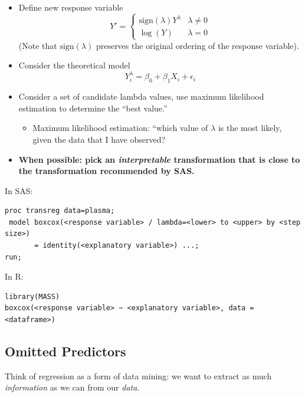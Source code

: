 \documentclass[12pt]{../notes}
\begin{document}
\begin{itemize}
\item Define new response variable 
\[Y' = 
\begin{cases} 
\text{sign}(\lambda)Y^\lambda & \lambda \ne 0 \\
\log(Y) & \lambda = 0
\end{cases}
\]
(Note that $\text{sign}(\lambda)$ preserves the original ordering of the response variable). 
\item Consider the theoretical model
\[Y_i^\lambda = \beta_0 + \beta_1X_i + \epsilon_i\]
\item Consider a set of candidate lambda values, use maximum likelihood estimation to determine the ``best value.''
\begin{itemize}
\item Maximum likelihood estimation: ``which value of $\lambda$ is the most likely, given the data that I have observed?
\end{itemize}
\item \textbf{When possible: pick an \textit{interpretable} transformation that is close to the transformation recommended by SAS.}

\begin{minipage}[l][1cm][c]{\textwidth}
\end{minipage}

\end{itemize}

In SAS:
\begin{verbatim}
proc transreg data=plasma;
 model boxcox(<response variable> / lambda=<lower> to <upper> by <step size>) 
       = identity(<explanatory variable>) ...;
run;
\end{verbatim}

In R:
\begin{verbatim}
library(MASS)
boxcox(<response variable> ~ <explanatory variable>, data = <dataframe>)
\end{verbatim}

\subsection*{Omitted Predictors}
Think of regression as a form of data mining: we want to extract as much \textit{information} as we can from our \textit{data}.
\end{document}
